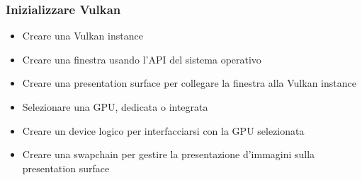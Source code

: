 \begin{frame}
\frametitle{Inizializzare Vulkan}

\begin{itemize}
\item Creare una Vulkan instance
\item Creare una finestra usando l'API del sistema operativo
\item Creare una presentation surface per collegare la finestra alla Vulkan instance
\item Selezionare una GPU, dedicata o integrata
\item Creare un device logico per interfacciarsi con la GPU selezionata
\item Creare una swapchain per gestire la presentazione d'immagini sulla presentation surface
\end{itemize}

\end{frame}
